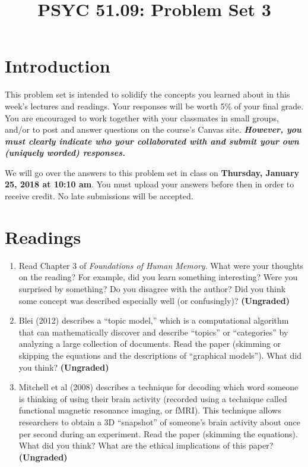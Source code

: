 \documentclass[11pt]{article}
\title{PSYC 51.09: Problem Set 3}
\date{}
\begin{document}
\maketitle
\vspace{-0.75in}
\section*{Introduction}
This problem set is intended to solidify the concepts you learned about in this week’s lectures and readings.  Your responses will be worth 5\% of your final grade.  You are encouraged to work together with your classmates in small groups, and/or to post and answer questions on the course’s Canvas site.  \textbf{\textit{However, you must clearly indicate who your collaborated with and submit your own (uniquely worded) responses.}}

We will go over the answers to this problem set in class on \textbf{Thursday, January 25, 2018 at 10:10 am}.  You must upload your answers before then in order to receive credit.  No late submissions will be accepted.

\section*{Readings}
\begin{enumerate}
\item Read Chapter 3 of \textit{Foundations of Human Memory}.  What were your thoughts on the reading?  For example, did you learn something interesting?  Were you surprised by something?  Do you disagree with the author?  Did you think some concept was described especially well (or confusingly)?  \textbf{(Ungraded)}
\item Blei (2012) describes a ``topic model,'' which is a computational algorithm that can mathematically discover and describe “topics” or “categories” by analyzing a large collection of documents.  Read the paper (skimming or skipping the equations and the descriptions of “graphical models”).  What did you think?  \textbf{(Ungraded)}
\item Mitchell et al (2008) describes a technique for decoding which word someone is thinking of using their brain activity (recorded using a technique called functional magnetic resonance imaging, or fMRI).  This technique allows researchers to obtain a 3D “snapshot” of someone’s brain activity about once per second during an experiment.  Read the paper (skimming the equations).  What did you think?  What are the ethical implications of this paper?  \textbf{(Ungraded)}
\end{enumerate}
\end{document}

